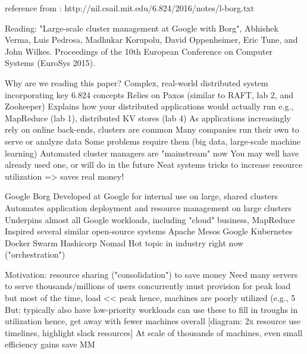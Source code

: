 reference from : http://nil.csail.mit.edu/6.824/2016/notes/l-borg.txt

Reading: "Large-scale cluster management at Google with Borg", Abhishek Verma,
Luis Pedrosa, Madhukar Korupolu, David Oppenheimer, Eric Tune, and John Wilkes.
Proceedings of the 10th European Conference on Computer Systems (EuroSys 2015).

Why are we reading this paper?
  Complex, real-world distributed system incorporating key 6.824 concepts
    Relies on Paxos (similar to RAFT, lab 2, and Zookeeper)
  Explains how your distributed applications would actually run
    e.g., MapReduce (lab 1), distributed KV stores (lab 4)
  As applications increasingly rely on online back-ends, clusters are common
    Many companies run their own to serve or analyze data
    Some problems require them (big data, large-scale machine learning)
  Automated cluster managers are "mainstream" now
    You may well have already used one, or will do in the future
    Neat systems tricks to increase resource utilization => saves real money!

Google Borg
  Developed at Google for internal use on large, shared clusters
    Automates application deployment and resource management on large clusters
    Underpins almost all Google workloads, including "cloud" business, MapReduce
  Inspired several similar open-source systems
    Apache Mesos
    Google Kubernetes
    Docker Swarm
    Hashicorp Nomad
  Hot topic in industry right now ("orchestration")

Motivation: resource sharing ("consolidation") to save money
  Need many servers to serve thousands/millions of users concurrently
    must provision for peak load
    but most of the time, load << peak
    hence, machines are poorly utilized (e.g., 5%
  But: typically also have low-priority workloads
    can use these to fill in troughs in utilization
    hence, get away with fewer machines overall
  [diagram: 2x resource use timelines, highlight slack resources]
  At scale of thousands of machines, even small efficiency gains save MM

